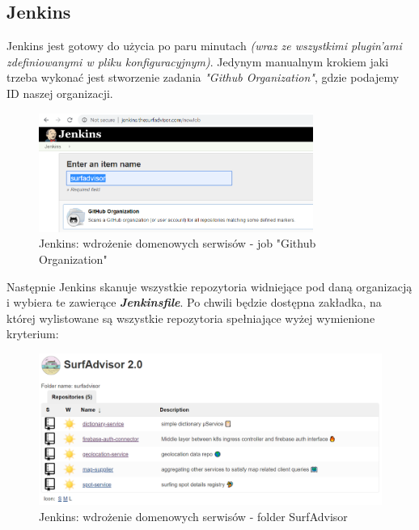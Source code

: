 \subsection{Jenkins}
\label{iac:jenkins}

Jenkins jest gotowy do użycia po paru minutach \emph{(wraz ze wszystkimi plugin'ami zdefiniowanymi w pliku konfiguracyjnym)}.
Jedynym manualnym krokiem jaki trzeba wykonać jest stworzenie zadania \emph{"Github Organization"}, gdzie podajemy ID naszej organizacji.

\begin{figure}[!ht]
	\begin{center}
		\includegraphics[width=0.8\textwidth]{img/jenkins-new-job}
	\end{center}
	\caption{Jenkins: wdrożenie domenowych serwisów - job "Github Organization"}
\end{figure}

Następnie Jenkins skanuje wszystkie repozytoria widniejące pod daną organizacją i wybiera te zawierące \textbf{\emph{Jenkinsfile}}.
Po chwili będzie dostępna zakładka, na której wylistowane są wszystkie repozytoria spełniające wyżej wymienione kryterium:

\begin{figure}[!ht]
	\begin{center}
		\includegraphics[width=1\textwidth]{img/jenkins-surf-folder}
	\end{center}
	\caption{Jenkins: wdrożenie domenowych serwisów - folder SurfAdvisor}
\end{figure}

